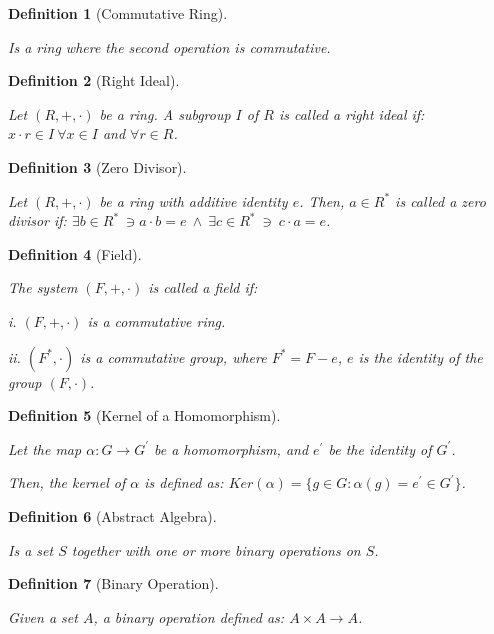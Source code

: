 \documentclass{article}
\newtheorem{definition}{Definition}
\begin{document}
\begin{definition}[Commutative Ring]
  $ $

   Is a ring where the second operation is commutative.
\end{definition}


\begin{definition}[Right Ideal]
  $ $

   Let $(R, +, \cdot )$ be a ring. A subgroup $I$ of $R$ is called a right ideal if: $x \cdot r \in I \ \forall x \in I$ and $\forall r \in R$.
\end{definition}

\begin{definition}[Zero Divisor]
  $ $

  Let $(R, +, \cdot)$ be a ring with additive identity $e$. Then, $a \in R^*$ is called a zero divisor if: $\exists b \in R^* \ \ni a \cdot b = e \ \land \ \exists c \in R^* \ \ni \ c \cdot a = e$. 
\end{definition}

\begin{definition}[Field]
  $ $

  The system $(F, +, \cdot)$ is called a field if:

  \qquad i. $(F, +, \cdot)$ is a commutative ring.

  \qquad ii. $(F^*, \cdot)$ is a commutative group, where $F^* = F - {e}$, $e$ is the identity of the group $(F, \cdot)$.
\end{definition}


\begin{definition}[Kernel of a Homomorphism]
  $ $

  Let the map $\alpha: G \rightarrow G^\prime$ be a homomorphism, and $e^\prime$ be the identity of $G^\prime$.

  Then, the kernel of $\alpha$ is defined as: $Ker(\alpha)=\{g \in G: \alpha(g) = e^\prime \in G^\prime \}$.
\end{definition}


\begin{definition}[Abstract Algebra]
  $ $

  Is a set $S$ together with one or more binary operations on $S$.
\end{definition}

\begin{definition}[Binary Operation]
  $ $

  Given a set $A$, a binary operation defined as: $A \times A \to A$.
\end{definition}
\end{document}
